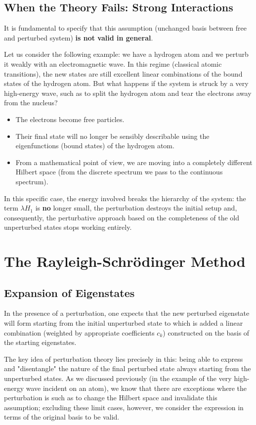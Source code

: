 \subsection{When the Theory Fails: Strong Interactions}
It is fundamental to specify that this assumption (unchanged basis between free and perturbed system) \textbf{is not valid in general}.

Let us consider the following example: we have a hydrogen atom and we perturb it weakly with an electromagnetic wave. In this regime (classical atomic transitions), the new states are still excellent linear combinations of the bound states of the hydrogen atom.
But what happens if the system is struck by a very high-energy wave, such as to split the hydrogen atom and tear the electrons away from the nucleus?
\begin{itemize}
\item The electrons become free particles.
\item Their final state will no longer be sensibly describable using the eigenfunctions (bound states) of the hydrogen atom.
\item From a mathematical point of view, we are moving into a completely different Hilbert space (from the discrete spectrum we pass to the continuous spectrum).
\end{itemize}
In this specific case, the energy involved breaks the hierarchy of the system: the term $\lambda H_1$ is \textbf{no} longer small, the perturbation destroys the initial setup and, consequently, the perturbative approach based on the completeness of the old unperturbed states stops working entirely.

\section{The Rayleigh-Schrödinger Method}

\subsection{Expansion of Eigenstates}
In the presence of a perturbation, one expects that the new perturbed eigenstate will form starting from the initial unperturbed state to which is added a linear combination (weighted by appropriate coefficients $c_k$) constructed on the basis of the starting eigenstates.

The key idea of perturbation theory lies precisely in this: being able to express and "disentangle" the nature of the final perturbed state always starting from the unperturbed states. As we discussed previously (in the example of the very high-energy wave incident on an atom), we know that there are exceptions where the perturbation is such as to change the Hilbert space and invalidate this assumption; excluding these limit cases, however, we consider the expression in terms of the original basis to be valid.

